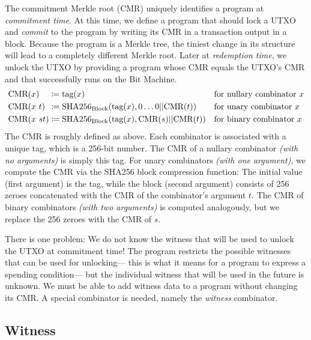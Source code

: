 The commitment Merkle root (CMR) uniquely identifies a program at \emph{commitment time}.
At this time,
we define a program that should lock a UTXO and \emph{commit} to the program by writing its CMR in a transaction output in a block.
Because the program is a Merkle tree,
the tiniest change in its structure will lead to a completely different Merkle root.
Later at \emph{redemption time},
we unlock the UTXO by providing a program whose CMR equals the UTXO's CMR and that successfully runs on the Bit Machine.
%
\begin{align*}
    \text{CMR}(x) \phantom{\ st} &\coloneqq \text{tag}(x) && \text{for nullary combinator $x$} \\
    \text{CMR}(x\ t) \phantom{s} &\coloneqq \text{SHA256}_\text{Block}(\text{tag}(x), 0\ldots 0 || \text{CMR}(t)) && \text{for unary combinator $x$} \\
    \text{CMR}(x\ st) &\coloneqq \text{SHA256}_\text{Block}(\text{tag}(x), \text{CMR}(s) || \text{CMR}(t)) && \text{for binary combinator $x$}
\end{align*}
%
The CMR is roughly defined as above.
Each combinator is associated with a unique tag, which is a 256-bit number.
The CMR of a nullary combinator \emph{(with no arguments)} is simply this tag.
For unary combinators \emph{(with one argument)},
we compute the CMR via the SHA256 block compression function:
The initial value (first argument) is the tag,
while the block (second argument) consists of 256 zeroes concatenated with the CMR of the combinator's argument $t$.
The CMR of binary combinators \emph{(with two arguments)} is computed analogously,
but we replace the 256 zeroes with the CMR of $s$.

There is one problem:
We do not know the witness that will be used to unlock the UTXO at commitment time!
The program restricts the possible witnesses that can be used for unlocking---%
this is what it means for a program to express a spending condition---%
but the individual witness that will be used in the future is unknown.
We must be able to add witness data to a program without changing its CMR.
A special combinator is needed, namely the \emph{witness} combinator.

\subsection{Witness}

